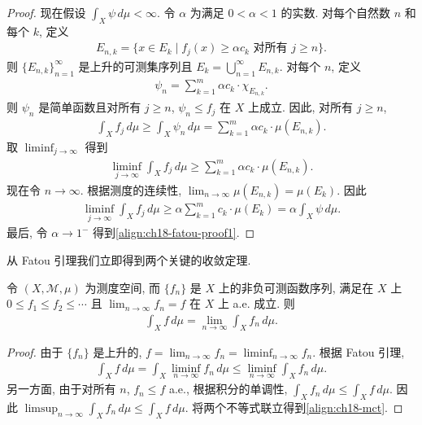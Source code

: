 \documentclass[../../main.tex]{subfiles}
\begin{document}
\begin{proof}
现在假设 $\int_{X}\psi\,d\mu<\infty$. 令 $\alpha$ 为满足 $0<\alpha<1$ 的实数. 对每个自然数 $n$ 和每个 $k$, 定义
\begin{align*}
E_{n,k}=\{x\in E_{k}\mid f_{j}(x)\geqslant\alpha c_{k}\text{ 对所有 }j\geqslant n\}.
\end{align*}
则 $\{E_{n,k}\}_{n=1}^{\infty}$ 是上升的可测集序列且 $E_{k}=\bigcup_{n=1}^{\infty}E_{n,k}$. 对每个 $n$, 定义
\begin{align*}
\psi_{n}=\sum_{k=1}^{m}\alpha c_{k}\cdot\chi_{E_{n,k}}.
\end{align*}
则 $\psi_{n}$ 是简单函数且对所有 $j\geqslant n$, $\psi_{n}\leqslant f_{j}$ 在 $X$ 上成立. 因此, 对所有 $j\geqslant n$,
\begin{align*}
\int_{X}f_{j}\,d\mu\geqslant\int_{X}\psi_{n}\,d\mu=\sum_{k=1}^{m}\alpha c_{k}\cdot\mu(E_{n,k}).
\end{align*}
取 $\liminf_{j\to\infty}$ 得到
\begin{align*}
\liminf_{j\to\infty}\int_{X}f_{j}\,d\mu\geqslant\sum_{k=1}^{m}\alpha c_{k}\cdot\mu(E_{n,k}).
\end{align*}
现在令 $n\to\infty$. 根据测度的连续性, $\lim_{n\to\infty}\mu(E_{n,k})=\mu(E_{k})$. 因此
\begin{align*}
\liminf_{j\to\infty}\int_{X}f_{j}\,d\mu\geqslant\alpha\sum_{k=1}^{m}c_{k}\cdot\mu(E_{k})=\alpha\int_{X}\psi\,d\mu.
\end{align*}
最后, 令 $\alpha\to 1^{-}$ 得到\eqref{align:ch18-fatou-proof1}.
\end{proof}

从 Fatou 引理我们立即得到两个关键的收敛定理.

\begin{theorem}[单调收敛定理]\label{theorem:ch18-monotone-convergence}
令 $(X,\mathcal{M},\mu)$ 为测度空间, 而 $\{f_{n}\}$ 是 $X$ 上的非负可测函数序列, 满足在 $X$ 上 $0\leqslant f_{1}\leqslant f_{2}\leqslant\cdots$ 且 $\lim_{n\to\infty}f_{n}=f$ 在 $X$ 上 a.e. 成立. 则
\begin{align}
\int_{X}f\,d\mu=\lim_{n\to\infty}\int_{X}f_{n}\,d\mu.\label{align:ch18-mct}
\end{align}
\end{theorem}

\begin{proof}
由于 $\{f_{n}\}$ 是上升的, $f=\lim_{n\to\infty}f_{n}=\liminf_{n\to\infty}f_{n}$. 根据 Fatou 引理,
\begin{align*}
\int_{X}f\,d\mu=\int_{X}\liminf_{n\to\infty}f_{n}\,d\mu\leqslant\liminf_{n\to\infty}\int_{X}f_{n}\,d\mu.
\end{align*}
另一方面, 由于对所有 $n$, $f_{n}\leqslant f$ a.e., 根据积分的单调性, $\int_{X}f_{n}\,d\mu\leqslant\int_{X}f\,d\mu$. 因此 $\limsup_{n\to\infty}\int_{X}f_{n}\,d\mu\leqslant\int_{X}f\,d\mu$. 将两个不等式联立得到\eqref{align:ch18-mct}.
\end{proof}
\end{document}

